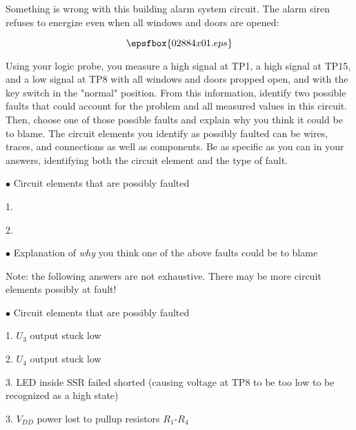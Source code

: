 

Something is wrong with this building alarm system circuit.  The alarm siren refuses to energize even when all windows and doors are opened:

$$\epsfbox{02884x01.eps}$$

Using your logic probe, you measure a high signal at TP1, a high signal at TP15, and a low signal at TP8 with all windows and doors propped open, and with the key switch in the "normal" position.  From this information, identify two possible faults that could account for the problem and all measured values in this circuit.  Then, choose one of those possible faults and explain why you think it could be to blame.  The circuit elements you identify as possibly faulted can be wires, traces, and connections as well as components.  Be as specific as you can in your answers, identifying both the circuit element and the type of fault.

\medskip
\goodbreak
\item{$\bullet$} Circuit elements that are possibly faulted
\item{1.}
\item{2.} 
\medskip

\medskip
\goodbreak
\item{$\bullet$} Explanation of {\it why} you think one of the above faults could be to blame

\vskip 30pt







Note: the following answers are not exhaustive.  There may be more circuit elements possibly at fault!

\medskip
\goodbreak
\item{$\bullet$} Circuit elements that are possibly faulted
\item{1.} $U_3$ output stuck low
\item{2.} $U_4$ output stuck low
\item{3.} LED inside SSR failed shorted (causing voltage at TP8 to be too low to be recognized as a high state)
\item{3.} $V_{DD}$ power lost to pullup resistors $R_1$-$R_4$
\medskip

